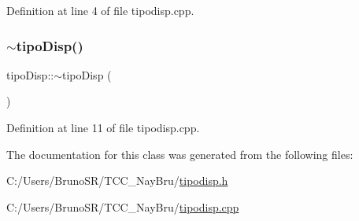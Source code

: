 Definition at line 4 of file tipodisp.\+cpp.

\hypertarget{classtipo_disp_a235a754bbe34fe3a8fd5826e57cf3abe}{}\label{classtipo_disp_a235a754bbe34fe3a8fd5826e57cf3abe} 
\subsubsection{\texorpdfstring{$\sim$tipo\+Disp()}{~tipoDisp()}}
{\footnotesize\ttfamily tipo\+Disp\+::$\sim$tipo\+Disp (\begin{DoxyParamCaption}{ }\end{DoxyParamCaption})}



Definition at line 11 of file tipodisp.\+cpp.



The documentation for this class was generated from the following files\+:\begin{DoxyCompactItemize}
\item 
C\+:/\+Users/\+Bruno\+S\+R/\+T\+C\+C\+\_\+\+Nay\+Bru/\hyperlink{tipodisp_8h}{tipodisp.\+h}\item 
C\+:/\+Users/\+Bruno\+S\+R/\+T\+C\+C\+\_\+\+Nay\+Bru/\hyperlink{tipodisp_8cpp}{tipodisp.\+cpp}\end{DoxyCompactItemize}
